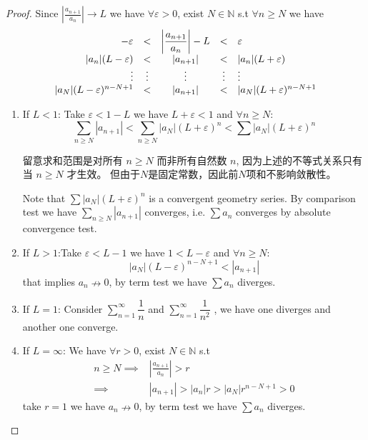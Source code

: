 \documentclass[
	UTF-8,
	11pt, %
	a4paper, %
]{LegrandOrangeBook}
\begin{document}
    \begin{proof}
        Since $ \left| \frac{a_{n+1}}{a_n} \right| \to L$ we have $\forall \varepsilon >0$, exist $N \in \mathbb{N}$ 
        s.t $\forall  n \geq N$ we have$$
        \begin{array}{r c c c l}
            -\varepsilon &<& \left| \dfrac{a_{n+1}}{a_n} \right|  - L &<& \varepsilon \\
                    |a_n|(L-\varepsilon) &<& |a_{n+1}| &<& |a_n|(L + \varepsilon) \\
                    \vdots&\vdots&\vdots&\vdots&\vdots \\
                    |a_N|(L-\varepsilon)^{n-N+1} &<& |a_{n+1}| &<& |a_N|(L + \varepsilon)^{n-N+1} 
            
        \end{array}$$
        \begin{enumerate}
            \item If $L < 1$: Take $\varepsilon < 1-L$ we have $L + \varepsilon < 1$ and $\forall n \geq N$:
            $$\sum_{n\geq N} |a_{n+1}| < \sum_{n\geq N} |a_N|(L + \varepsilon)^n < \sum |a_N|(L + \varepsilon)^n $$
            \begin{remark}
                留意求和范围是对所有 $n \geq N$ 而非所有自然数 $n$, 因为上述的不等式关系只有当 $n \geq N$ 才生效。
                但由于$N$是固定常数，因此前$N$项和不影响敛散性。
            \end{remark}
            Note that $\sum |a_N|(L + \varepsilon)^n$ is a convergent geometry series. 
            By comparison test we have $\sum _{n\geq N}|a_{n+1}|$ converges, i.e. $\sum a_{n}$ 
            converges by absolute convergence test. 

            \item If $L > 1$:Take $\varepsilon < L - 1$ we have $1 < L - \varepsilon$ and $\forall n \geq N$:
            $$ |a_N|(L - \varepsilon)^{n-N+1} < |a_{n+1}| $$
            that implies $a_n \nrightarrow 0$, by term test we have $\sum a_n$ diverges.

            \item If $L = 1$: Consider $\sum_{n=1}^{\infty} \dfrac{1}{n}$ and $\sum_{n=1}^{\infty} \dfrac{1}{n^2}$
            , we have one diverges and another one converge.

            \item If $L = \infty$: We have $\forall r >0$, exist $N \in \mathbb{N}$ s.t 
            \begin{align*}
            n \geq N \implies&  \left| \frac{a_{n+1}}{a_n} \right| > r \\
            \implies&  \left| a_{n+1} \right| > |a_n| r > |a_N| r^{n-N+1} >0
            \end{align*}
            take $r = 1$ we have $a_n \nrightarrow 0$, 
            by term test we have $\sum a_n$ diverges.
        \end{enumerate}
    \end{proof}
\end{document}
